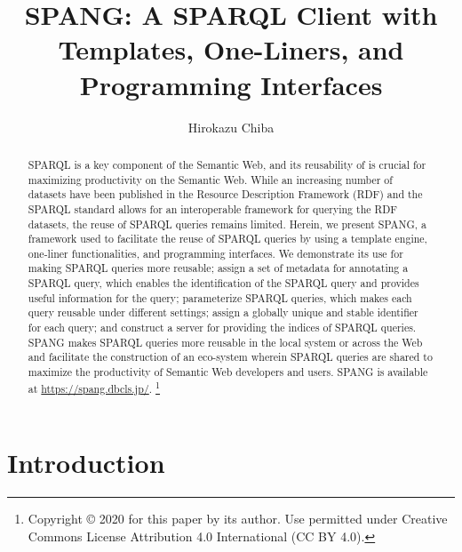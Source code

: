 \documentclass[runningheads]{llncs}
\newcommand\blfootnote[1]{%
  \begingroup
  \renewcommand\thefootnote{}\footnote{#1}%
  \addtocounter{footnote}{-1}%
  \endgroup
}
\begin{document}
\title{SPANG: A SPARQL Client with Templates, One-Liners, and Programming Interfaces}
\author{Hirokazu Chiba}
%
\maketitle              %
%

\begin{abstract}
SPARQL is a key component of the Semantic Web, and its reusability of is crucial for maximizing productivity on the Semantic Web.
While an increasing number of datasets have been published in the Resource Description Framework (RDF) and the SPARQL standard allows for an interoperable framework for querying the RDF datasets, the reuse of SPARQL queries remains limited. Herein, we present SPANG, a framework used to facilitate the reuse of SPARQL queries by using a template engine, one-liner functionalities, and programming interfaces. We demonstrate its use for making SPARQL queries more reusable; assign a set of metadata for annotating a SPARQL query, which enables the identification of the SPARQL query and provides useful information for the query; parameterize SPARQL queries, which makes each query reusable under different settings; assign a globally unique and stable identifier for each query; and construct a server for providing the indices of SPARQL queries. SPANG makes SPARQL queries more reusable in the local system or across the Web and facilitate the construction of an eco-system wherein SPARQL queries are shared to maximize the productivity of Semantic Web developers and users. SPANG is available at \url{https://spang.dbcls.jp/}.
\blfootnote{Copyright © 2020 for this paper by its author. Use permitted under Creative Commons License Attribution 4.0 International (CC BY 4.0).}

\end{abstract}


\section{Introduction}
\end{document}
